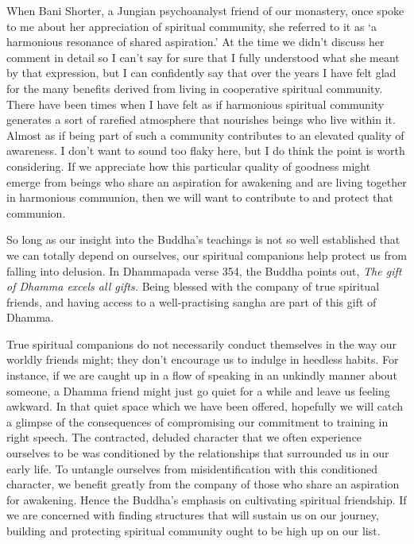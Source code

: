 When Bani Shorter, a Jungian psychoanalyst friend of our monastery, once
spoke to me about her appreciation of spiritual community, she referred
to it as `a harmonious resonance of shared aspiration.' At the time we
didn't discuss her comment in detail so I can't say for sure that I
fully understood what she meant by that expression, but I can
confidently say that over the years I have felt glad for the many
benefits derived from living in cooperative spiritual community. There
have been times when I have felt as if harmonious spiritual community
generates a sort of rarefied atmosphere that nourishes beings who live
within it. Almost as if being part of such a community contributes to an
elevated quality of awareness. I don't want to sound too flaky here, but
I do think the point is worth considering. If we appreciate how this
particular quality of goodness might emerge from beings who share an
aspiration for awakening and are living together in harmonious
communion, then we will want to contribute to and protect that
communion.

So long as our insight into the Buddha's teachings is not so well
established that we can totally depend on ourselves, our spiritual
companions help protect us from falling into delusion. In Dhammapada
verse 354, the Buddha points out, \emph{The gift of Dhamma excels all
gifts.} Being blessed with the company of true spiritual friends, and
having access to a well-practising sangha are part of this gift of
Dhamma.

True spiritual companions do not necessarily conduct themselves in the
way our worldly friends might; they don't encourage us to indulge in
heedless habits. For instance, if we are caught up in a flow of speaking
in an unkindly manner about someone, a Dhamma friend might just go quiet
for a while and leave us feeling awkward. In that quiet space which we
have been offered, hopefully we will catch a glimpse of the consequences
of compromising our commitment to training in right speech. The
contracted, deluded character that we often experience ourselves to be
was conditioned by the relationships that surrounded us in our early
life. To untangle ourselves from misidentification with this conditioned
character, we benefit greatly from the company of those who share an
aspiration for awakening. Hence the Buddha's emphasis on cultivating
spiritual friendship\cite{friendship}. If we are concerned with finding structures that
will sustain us on our journey, building and protecting spiritual
community ought to be high up on our list.

